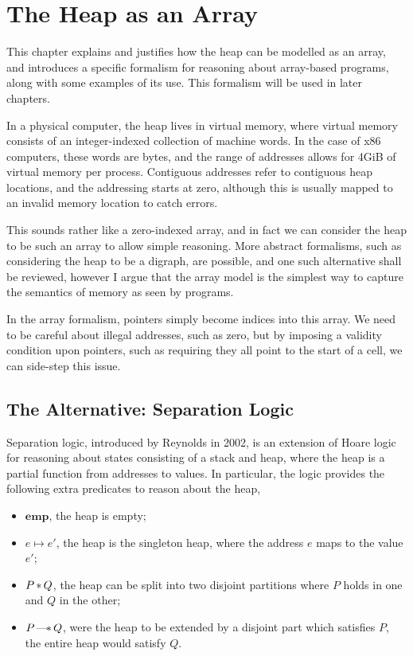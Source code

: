 \chapter{The Heap as an Array}
\label{sec:heap}

This chapter explains and justifies how the heap can be modelled as an
array, and introduces a specific formalism for reasoning about
array-based programs, along with some examples of its use. This
formalism will be used in later chapters.

In a physical computer, the heap lives in virtual memory, where
virtual memory consists of an integer-indexed collection of machine
words. In the case of x86 computers, these words are bytes, and the
range of addresses allows for 4GiB of virtual memory per
process. Contiguous addresses refer to contiguous heap locations, and
the addressing starts at zero, although this is usually mapped to an
invalid memory location to catch errors.

This sounds rather like a zero-indexed array, and in fact we can
consider the heap to be such an array to allow simple reasoning. More
abstract formalisms, such as considering the heap to be a digraph, are
possible, and one such alternative shall be reviewed, however I argue
that the array model is the simplest way to capture the semantics of
memory as seen by programs.

In the array formalism, pointers simply become indices into this
array. We need to be careful about illegal addresses, such as zero,
but by imposing a validity condition upon pointers, such as requiring
they all point to the start of a cell, we can side-step this issue.

\section{The Alternative: Separation Logic}
\label{sec:heap-separation}

Separation logic, introduced by Reynolds in 2002\cite{Reynolds02}, is
an extension of Hoare logic for reasoning about states consisting of a
stack and heap, where the heap is a partial function from addresses to
values. In particular, the logic provides the following extra
predicates to reason about the heap,

\begin{itemize}
  \item $\mathbf{emp}$, the heap is empty;

  \item $e \mapsto e'$, the heap is the singleton heap, where the
    address $e$ maps to the value $e'$;

  \item $P \operatorname{\ast} Q$, the heap can be split into two disjoint partitions
    where $P$ holds in one and $Q$ in the other;

  \item $P \operatorname{---\!\ast} Q$, were the heap to be extended by a disjoint part
    which satisfies $P$, the entire heap would satisfy $Q$.
\end{itemize}

